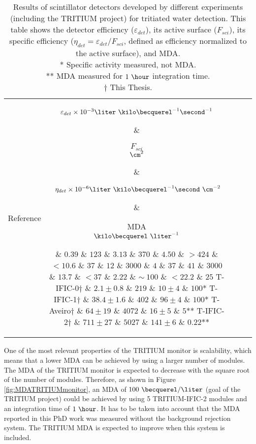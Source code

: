 \begin{enumerate}
\begin{table}[htbp]
\centering{}%
\begin{tabular}{lcrcc}
\toprule 
Reference & \parbox{5em}{$\varepsilon_{det}\times10^{-3}\\\liter~\kilo\becquerel^{-1}\second^{-1}$}  & \parbox{3.5em}{\raggedleft $F_{sci}$\\ $\cm^2$}  & \parbox{6.5em}{$~\eta_{det}\times 10^{-6}\\\liter~\kilo\becquerel^{-1}\second~\cm^{-2}$} &  \parbox{3.5em}{MDA\\$\kilo\becquerel~\liter^{-1}$} \tabularnewline
\midrule
\midrule 
\cite{Muramatsu} & $0.39$ & $123$ & $3.13$ & $370$ \tabularnewline
\cite{Moghissi} & $4.50$ & $>424$ & $<10.6$ & $37$ \tabularnewline
\cite{Osborne} & $12$ & $3000$ & $4$ & $37$ \tabularnewline
\cite{Ratnakaran} & $41$ & $3000$ & $13.7$ & $<37$ \tabularnewline
\cite{Hofstetter1} & $2.22$ & $\sim~100$ & $<22.2$ & $25$ \tabularnewline
T-IFIC-0$\dagger$ & $2.1 \pm 0.8$ & $219$ & $10 \pm 4$ & $100$* \tabularnewline
T-IFIC-1$\dagger$ & $38.4 \pm 1.6$ & $402$ & $96 \pm 4$ & $100$* \tabularnewline
T-Aveiro$\dagger$ & $64 \pm 19$ & $4072$ & $16 \pm 5$ & $5$** \tabularnewline
T-IFIC-2$\dagger$ & $711 \pm 27$ & $5027$ & $141 \pm 6$ & $0.22$** \tabularnewline
\bottomrule
\end{tabular}
\caption{Results of scintillator detectors developed by different experiments (including the TRITIUM project) for tritiated water detection. This table shows the detector efficiency ($\varepsilon_{det}$), its active surface ($F_{sci}$), its specific efficiency ($\eta_{det}=\varepsilon_{det}/F_{sci}$, defined as efficiency normalized to the active surface), and MDA.\\
* Specific activity measured, not MDA.\\ 
** MDA measured for $1~\hour$ integration time.\\
$\dagger$ This Thesis.}
\label{tab:ComparisonResultsTritium}
\end{table}

One of the most relevant properties of the TRITIUM monitor is scalability, which means that a lower MDA can be achieved by using a larger number of modules. The MDA of the TRITIUM monitor is expected to decrease with the square root of the number of modules. Therefore, as shown in Figure \ref{fig:MDATRITIUMmonitor}, an MDA of  $100~\becquerel/\liter$ (goal of the TRITIUM project) could be achieved by using 5 TRITIUM-IFIC-2 modules and an integration time of $1~\hour$. It has to be taken into account that the MDA reported in this PhD work was measured without the background rejection system. The TRITIUM MDA is expected to improve when this system is included.


\end{enumerate}
